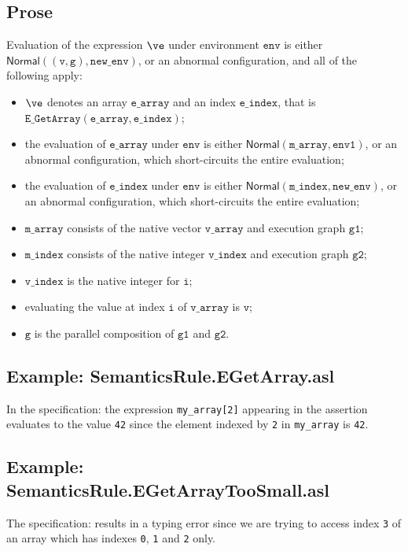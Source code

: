 \documentclass{book}
\newcommand\ProseOrAbnormal[0]{or an abnormal configuration, which short-circuits the entire evaluation}
\newcommand\Normal[0]{\textsf{Normal}}
\newcommand\newenv[0]{\texttt{new\_env}}
\newcommand\env[0]{\texttt{env}}
\newcommand\envone[0]{\texttt{env1}}
\newcommand\vi[0]{\texttt{i}}
\newcommand\vg[0]{\texttt{g}}
\newcommand\vv[0]{\texttt{v}}
\newcommand\vgone[0]{\texttt{g1}}
\newcommand\vgtwo[0]{\texttt{g2}}
\newcommand\earray[0]{\texttt{e\_array}}
\newcommand\eindex[0]{\texttt{e\_index}}
\newcommand\marray[0]{\texttt{m\_array}}
\newcommand\mindex[0]{\texttt{m\_index}}
\newcommand\varray[0]{\texttt{v\_array}}
\newcommand\vindex[0]{\texttt{v\_index}}
\begin{document}
  \subsection{Prose}
  Evaluation of the expression $\ve$ under environment $\env$ is either \\
  $\Normal((\vv, \vg), \newenv)$, or an abnormal configuration, and all of the following apply:
  \begin{itemize}
  \item $\ve$ denotes an array $\earray$ and an index $\eindex$,
  that is \\ $\texttt{E\_GetArray}(\earray, \eindex)$;
  \item the evaluation of $\earray$ under $\env$ is either $\Normal(\marray, \envone)$,
  \ProseOrAbnormal;
  \item the evaluation of $\eindex$ under $\env$ is either  $\Normal(\mindex, \newenv)$,
  \ProseOrAbnormal;
  \item $\marray$ consists of the native vector $\varray$ and execution graph $\vgone$;
  \item $\mindex$ consists of the native integer $\vindex$ and execution graph $\vgtwo$;
  \item $\vindex$ is the native integer for $\vi$;
  \item evaluating the value at index $\vi$ of $\varray$ is $\vv$;
  \item $\vg$ is the parallel composition of $\vgone$ and $\vgtwo$.
  \end{itemize}

  \subsection{Example: SemanticsRule.EGetArray.asl}
    In the specification:
    the expression \texttt{my\_array[2]} appearing in the assertion evaluates to the value \texttt{42} since the element
    indexed by \texttt{2} in \texttt{my\_array} is \texttt{42}.

  \subsection{Example: SemanticsRule.EGetArrayTooSmall.asl}
    The specification:
    results in a typing error since we are trying to access index \texttt{3} of an array
    which has indexes \texttt{0}, \texttt{1} and \texttt{2} only.
\end{document}
